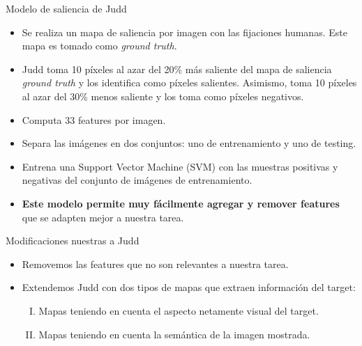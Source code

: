 \documentclass[compress]{beamer}
\begin{document}
\begin{frame}{Modelo de saliencia de Judd}
\begin{itemize}
\item Se realiza un mapa de saliencia por imagen con las fijaciones humanas. Este mapa es tomado como \textit{ground truth}.
\item Judd toma 10 píxeles al azar del 20\% más saliente del mapa de saliencia \textit{ground truth} y los identifica como píxeles salientes. Asimismo, toma 10 píxeles al azar del 30\% menos saliente y los toma como píxeles negativos.
\item Computa 33 features por imagen.
\item Separa las imágenes en dos conjuntos: uno de entrenamiento y uno de testing. 
\item Entrena una Support Vector Machine (SVM) con las muestras positivas y negativas del conjunto de imágenes de entrenamiento.
\item \textbf{Este modelo permite muy fácilmente agregar y remover features} que se adapten mejor a nuestra tarea.
\end{itemize}
\end{frame}

\begin{frame}{Modificaciones nuestras a Judd}
\begin{itemize}
\item Removemos las features que no son relevantes a nuestra tarea.
\bigskip
\item Extendemos Judd con dos tipos de mapas que extraen información del target:
\begin{enumerate}[I.]
\item Mapas teniendo en cuenta el aspecto netamente visual del target.
\item Mapas teniendo en cuenta la semántica de la imagen mostrada.
\end{enumerate}
\end{itemize}
\end{frame}
\end{document}

